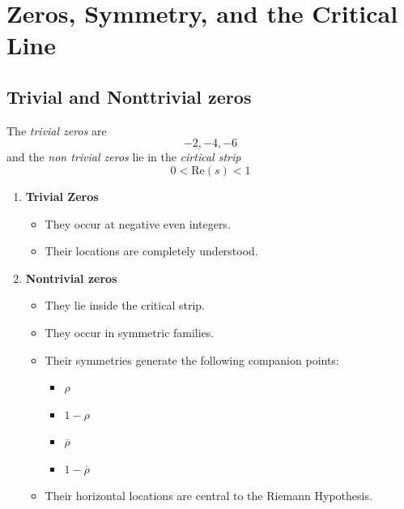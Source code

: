 \documentclass[twocolumn,10pt]{article}
\begin{document}
\section{Zeros, Symmetry, and the Critical Line}
\subsection{Trivial and Nonttrivial zeros}
The \emph{trivial zeros} are 
\[-2, -4, -6\]
and the \emph{non trivial zeros} lie in the \emph{cirtical strip}
\[0<\text{Re}(s) < 1\]

\begin{enumerate}[label=\Alph*]
    \item \textbf{Trivial Zeros}
        \begin{itemize}[label=$\nmid$]
            \item They occur at negative even integers.
            \item Their locations are completely understood.
        \end{itemize}
    \item \textbf{Nontrivial zeros}
        \begin{itemize}[label=$\ni$]
            \item  They lie inside the critical strip.
            \item They occur in symmetric families.
            \item Their symmetries generate the following companion points:
            \begin{itemize}[label=\Roman*]
                \item $\rho$
                \item $1-\rho$
                \item $\overline{\rho}$
                \item $1- \overline{\rho}$
            \end{itemize}
            \item Their horizontal locations are central to the Riemann Hypothesis.
        \end{itemize}
\end{enumerate}
\end{document}
